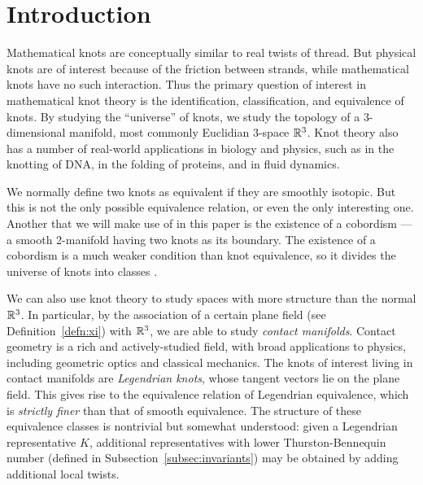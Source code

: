 \chapter{Introduction}\label{ch:intro}

Mathematical knots are conceptually similar to real twists of thread. But physical knots are of interest because of the friction between strands, while mathematical knots have no such interaction.
Thus the primary question of interest in mathematical knot theory is the identification, classification, and equivalence of knots. By studying the ``universe'' of knots, we study the topology of a 3-dimensional manifold, most commonly Euclidian 3-space $\mathbb{R}^3$. 
Knot theory also has a number of real-world applications in biology and physics, such as in the knotting of DNA, in the folding of proteins, and in fluid dynamics.

We normally define two knots as equivalent if they are smoothly isotopic.
But this is not the only possible equivalence relation, or even the only interesting one. Another that we will make use of in this paper is the existence of a cobordism --- a smooth 2-manifold having two knots as its boundary.
The existence of a cobordism is a much weaker condition than knot equivalence, so it divides the universe of knots into classes \cite{fox-milnor}.

We can also use knot theory to study spaces with more structure than the normal $\mathbb{R}^3$. 
In particular, by the association of a certain plane field (see Definition~\ref{defn:xi}) with $\mathbb{R}^3$, we are able to study \emph{contact manifolds}. Contact geometry is a rich and actively-studied field, with broad applications to physics, including geometric optics and classical mechanics. The knots of interest living in contact manifolds are \emph{Legendrian knots}, whose tangent vectors lie on the plane field.
This gives rise to the equivalence relation of Legendrian equivalence, which is \emph{strictly finer} than that of smooth equivalence.
The structure of these equivalence classes is nontrivial but somewhat understood: given a Legendrian representative $K$, additional representatives with lower Thurston-Bennequin number (defined in Subsection~\ref{subsec:invariants}) may be obtained by adding additional local twists.


